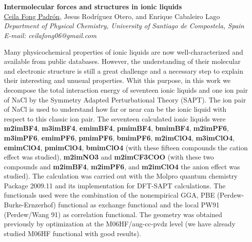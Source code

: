 \newpage
\setcounter{figure}{0}
\section*{}
\begin{center}
{\bf \Large
Intermolecular forces and structures in ionic liquids
}
\\
\vspace{0.5cm}
\underline{Ceila Fong Padrón}, Jesus Rodríguez Otero, and Enrique Cabaleiro Lago
\\
\vspace{0.5cm}
{\it
  Department of Physical Chemistry, University of Santiago de Compostela, Spain
}
\\
\vspace{0.5cm}
{\it E-mail: ceilafong06@gmail.com }
\\
\vspace{0.5cm}
\end{center}
Many physicochemical properties of ionic liquids are now well-characterized and
available from public databases. However, the understanding of their molecular and
electronic structure is still a great challenge and a necessary step to explain their
interesting and unusual properties. Whit this purpose, in this work we decompose the
total interaction energy of seventeen ionic liquids and one ion pair of NaCl by the
Symmetry Adapted Perturbational Theory (SAPT). The ion pair of NaCl is used to
understand how far or near can be the ionic liquid with respect to this classic ion pair.
The seventeen calculated ionic liquids were {\bf m2imBF4}, {\bf m3imBF4}, {\bf emimBF4},
{\bf pmimBF4}, {\bf bmimBF4}, {\bf m2imPF6}, {\bf m3imPF6}, {\bf emimPF6}, {\bf pmimPF6}, {\bf bmimPF6},
{\bf m2imClO4}, {\bf m3imClO4}, {\bf emimClO4}, {\bf pmimClO4}, {\bf bmimClO4} (with these fifteen
compounds the cation effect was studied), {\bf m2imNO3} and {\bf m2imCF3COO} (with these
two compounds and {\bf m2imBF4}, {\bf m2imPF6}, and {\bf m2imClO4} the anion effect was studied).
The calculation was carried out with the Molpro quantum chemistry Package 2009.11
and its implementation for DFT-SAPT calculations. The functionals used were the
combination of the nonempirical GGA, PBE (Perdew-Burke-Ernzerhof) functional as
exchange functional and the local PW91 (Perdew/Wang 91) as correlation functional.
The geometry was obtained previously by optimization at the M06HF/aug-cc-pvdz level
(we have already studied M06HF functional with good results).
\\
\vspace{1.5cm}

